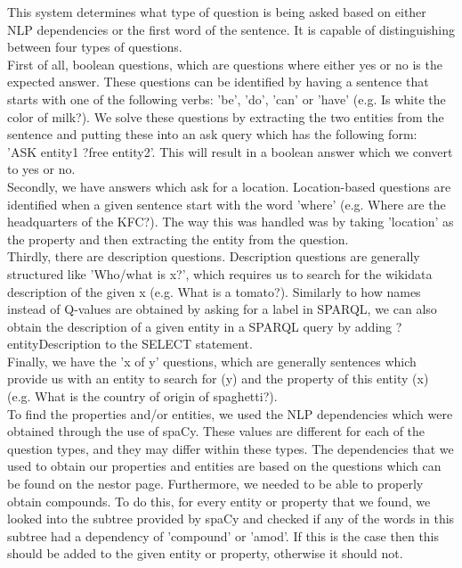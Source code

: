 \documentclass{article}
\begin{document}
This system determines what type of question is being asked based on either NLP dependencies or the first word of the sentence. It is capable of distinguishing between four types of questions.\\
First of all, boolean questions, which are questions where either yes or no is the expected answer. These questions can be identified by having a sentence that starts with one of the following verbs: 'be', 'do', 'can' or 'have' (e.g. Is white the color of milk?). We solve these questions by extracting the two entities from the sentence and putting these into an ask query which has the following form:\\
'ASK{ entity1 ?free entity2}'. This will result in a boolean answer which we convert to yes or no.\\
Secondly, we have answers which ask for a location. Location-based questions are identified when a given sentence start with the word 'where' (e.g. Where are the headquarters of the KFC?). The way this was handled was by taking 'location' as the property and then extracting the entity from the question.\\
Thirdly, there are description questions. Description questions are generally structured like 'Who/what is x?', which requires us to search for the wikidata description of the given x (e.g. What is a tomato?). Similarly to how names instead of Q-values are obtained by asking for a label in SPARQL, we can also obtain the description of a given entity in a SPARQL query by adding ?entityDescription to the SELECT statement.\\
Finally, we have the 'x of y' questions, which are generally sentences which provide us with an entity to search for (y) and the property of this entity (x) (e.g. What is the country of origin of spaghetti?).\\
To find the properties and/or entities, we used the NLP dependencies which were obtained through the use of spaCy. These values are different for each of the question types, and they may differ within these types. The dependencies that we used to obtain our properties and entities are based on the questions which can be found on the nestor page. Furthermore, we needed to be able to properly obtain compounds. To do this, for every entity or property that we found, we looked into the subtree provided by spaCy and checked if any of the words in this subtree had a dependency of 'compound' or 'amod'. If this is the case then this should be added to the given entity or property, otherwise it should not.\\
\end{document}
